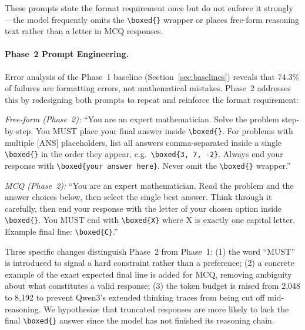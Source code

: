 \documentclass{article}
\begin{document}
\vspace{0.5em}
These prompts state the format requirement once but do not enforce it strongly—the model frequently omits the \texttt{\textbackslash boxed\{\}} wrapper or places free-form reasoning text rather than a letter in MCQ responses.

\paragraph{Phase~2 Prompt Engineering.}
Error analysis of the Phase~1 baseline (Section~\ref{sec:baselines}) reveals that 74.3\% of failures are formatting errors, not mathematical mistakes. Phase~2 addresses this by redesigning both prompts to repeat and reinforce the format requirement:

\vspace{0.5em}
\noindent\textit{Free-form (Phase~2):} ``You are an expert mathematician. Solve the problem step-by-step. You MUST place your final answer inside \texttt{\textbackslash boxed\{\}}. For problems with multiple [ANS] placeholders, list all answers comma-separated inside a single \texttt{\textbackslash boxed\{\}} in the order they appear, e.g.\ \texttt{\textbackslash boxed\{3, 7, -2\}}. Always end your response with \texttt{\textbackslash boxed\{your answer here\}}. Never omit the \texttt{\textbackslash boxed\{\}} wrapper.''

\vspace{0.5em}
\noindent\textit{MCQ (Phase~2):} ``You are an expert mathematician. Read the problem and the answer choices below, then select the single best answer. Think through it carefully, then end your response with the letter of your chosen option inside \texttt{\textbackslash boxed\{\}}. You MUST end with \texttt{\textbackslash boxed\{X\}} where X is exactly one capital letter. Example final line: \texttt{\textbackslash boxed\{C\}}.''

\vspace{0.5em}
Three specific changes distinguish Phase~2 from Phase~1: (1) the word ``MUST'' is introduced to signal a hard constraint rather than a preference; (2) a concrete example of the exact expected final line is added for MCQ, removing ambiguity about what constitutes a valid response; (3) the token budget is raised from 2,048 to 8,192 to prevent Qwen3's extended thinking traces from being cut off mid-reasoning. We hypothesize that truncated responses are more likely to lack the final \texttt{\textbackslash boxed\{\}} answer since the model has not finished its reasoning chain.
\end{document}
